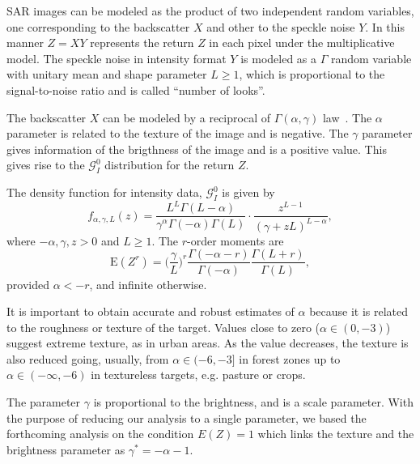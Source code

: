 \documentclass[technote,onecolumn,draftcls,12pt]{IEEEtran}
\numberwithin{equation}{section}
\begin{document}
SAR images can be modeled as the product of two independent random variables, one corresponding to the backscatter $X$ and other to the speckle noise $Y$. In this manner $Z=X Y  $ represents the return $Z$ in each pixel under the multiplicative model.
The speckle noise in intensity format $Y$ is modeled as a $\Gamma $ random variable with unitary mean and shape parameter $L\geq1$, which is proportional to the signal-to-noise ratio and is called ``number of looks''. 

The backscatter $X$ can be modeled by a reciprocal of $\Gamma(\alpha,\gamma) $ law~\cite{Frery97,MejailJacoboFreryBustos:IJRS}. 
The $\alpha$ parameter is related to the texture of the image and is negative. 
The $\gamma$ parameter gives information of the brigthness of the image and is a positive value. This gives rise to the $\mathcal{G}_I^{0}$ distribution for the return $Z$.

The density function for intensity data, $\mathcal{G}_I^{0}$ is given by
\begin{equation}
f_{\alpha,\gamma,L}( z) =\frac{L^{L}\Gamma ( L-\alpha
	) }{\gamma ^{\alpha }\Gamma ( -\alpha ) \Gamma (
	L) }\cdot  
\frac{z^{L-1}}{( \gamma +zL) ^{L-\alpha }},%
\label{ec_dens_gI0}
\end{equation}
where $-\alpha,\gamma ,z>0$ and $L\geq 1$. 
The $r$-order moments are
\begin{equation}
\text{E}(Z^r) =\Big(\frac{\gamma}{L}\Big)^r\frac{\Gamma ( -\alpha-r )}{ \Gamma (-\alpha) }
\frac{\Gamma (L+r )}{\Gamma (L)},
\label{moments_gI0}
\end{equation}
provided $\alpha<-r$, and infinite otherwise.

It is important to obtain accurate and robust estimates of $\alpha$ because  it is related to the roughness or texture of the target. 
Values close to zero ($\alpha \in (0,-3)$) suggest extreme texture, as in urban areas. 
As the value decreases, the texture is also reduced going, usually, from $\alpha \in (-6,-3]$ in forest zones up to $\alpha\in(-\infty,-6)$ in textureless targets, e.g. pasture or crops.

The parameter $\gamma$ is proportional to the brightness, and is a scale parameter.
With the purpose of reducing our analysis to a single parameter, we based the forthcoming analysis on the condition $E(Z)=1$ which links the texture and the brightness parameter as $\gamma^* =-\alpha-1$.
\end{document}
